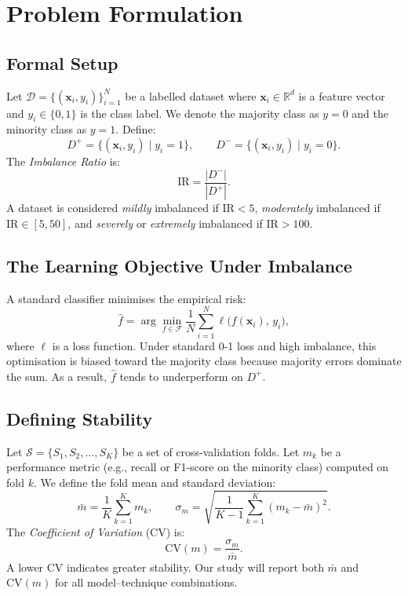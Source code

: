 \documentclass[11pt,a4paper]{article}
\newcommand{\Dplus}{D^{+}}
\newcommand{\Dminus}{D^{-}}
\newcommand{\IR}{\mathrm{IR}}
\newcommand{\CV}{\mathrm{CV}}
\begin{document}
\section{Problem Formulation}

\subsection{Formal Setup}

Let $\mathcal{D} = \{(\mathbf{x}_i, y_i)\}_{i=1}^{N}$ be a labelled dataset where
$\mathbf{x}_i \in \mathbb{R}^d$ is a feature vector and $y_i \in \{0,1\}$ is the class label.
We denote the majority class as $y=0$ and the minority class as $y=1$. Define:
\[
  \Dplus = \{(\mathbf{x}_i, y_i) \mid y_i = 1\}, \qquad
  \Dminus = \{(\mathbf{x}_i, y_i) \mid y_i = 0\}.
\]
The \emph{Imbalance Ratio} is:
\[
  \IR = \frac{|\Dminus|}{|\Dplus|}.
\]
A dataset is considered \emph{mildly} imbalanced if $\IR < 5$, \emph{moderately} imbalanced
if $\IR \in [5, 50]$, and \emph{severely} or \emph{extremely} imbalanced if $\IR > 100$.

\subsection{The Learning Objective Under Imbalance}

A standard classifier minimises the empirical risk:
\[
  \hat{f} = \arg\min_{f \in \mathcal{F}} \frac{1}{N} \sum_{i=1}^{N}
  \ell\!\bigl(f(\mathbf{x}_i),\, y_i\bigr),
\]
where $\ell$ is a loss function. Under standard 0-1 loss and high imbalance, this optimisation
is biased toward the majority class because majority errors dominate the sum. As a result,
$\hat{f}$ tends to underperform on $\Dplus$.

\subsection{Defining Stability}

Let $\mathcal{S} = \{S_1, S_2, \ldots, S_K\}$ be a set of cross-validation folds. Let $m_k$
be a performance metric (e.g., recall or F1-score on the minority class) computed on fold $k$.
We define the fold mean and standard deviation:
\[
  \bar{m} = \frac{1}{K}\sum_{k=1}^{K} m_k, \qquad
  \sigma_m = \sqrt{\frac{1}{K-1}\sum_{k=1}^{K}(m_k - \bar{m})^2}.
\]
The \emph{Coefficient of Variation} (CV) is:
\[
  \CV(m) = \frac{\sigma_m}{\bar{m}}.
\]
A lower CV indicates greater stability. Our study will report both $\bar{m}$ and $\CV(m)$
for all model--technique combinations.
\end{document}
